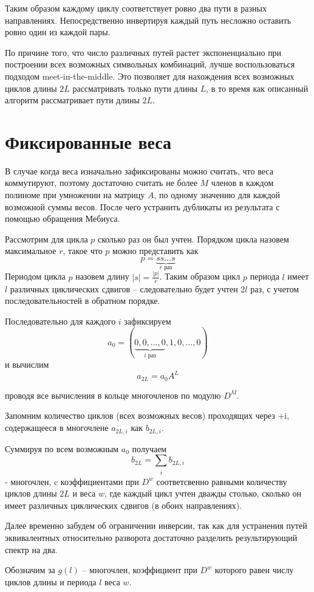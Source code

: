 \documentclass[specification,annotation,times]{itmo-student-thesis}
\begin{document}
Таким образом каждому циклу соответствует ровно два пути в разных направлениях. Непосредственно
инвертируя каждый путь несложно оставить ровно один из каждой пары.

По причине того, что число различных путей растет
экспоненциально при построении всех возможных символьных комбинаций, лучше воспользоваться подходом
meet-in-the-middle. Это позволяет для нахождения всех возможных циклов длины $2L$ рассматривать
только пути длины $L$, в то время как описанный алгоритм рассматривает пути длины $2L$.

\section{Фиксированные веса}
В случае когда веса изначально зафиксированы можно считать, что веса коммутируют, поэтому достаточно
считать не более $M$ членов в каждом полиноме при умножении на матрицу $A$,
 по одному значению для каждой возможной суммы весов. После чего устранить дубликаты из результата с 
помощью обращения Мебиуса.

Рассмотрим для цикла $p$ сколько раз он был учтен. Порядком цикла назовем максимальное $r$, такое что
$p$ можно представить как 
\[
p=\underbrace{ss \ldots s}_{r \text{ раз}}
\]
Периодом цикла $p$ назовем длину $|s|=\frac{|p|}{r}$. Таким образом цикл $p$ 
периода $l$ имеет $l$ различных циклических сдвигов -- следовательно будет учтен $2l$ раз, с учетом
последовательностей в обратном порядке.

Последовательно для каждого $i$ зафиксируем
\[
a_0=(\underbrace{0,0,...,0}_{i \text{ раз}},1,0,...,0)
\]
и вычислим
\[
a_{2L}=a_0A^L
\]

проводя все вычисления в кольце многочленов по модулю $D^M$.

Запомним количество циклов (всех возможных весов) проходящих через +i, содержащееся в 
многочлене $a_{2L,i}$ как $b_{2L,i}$.

Суммируя по всем возможным $a_0$ получаем 
\[
b_{2L}=\sum_{\substack{i}}b_{2L,i}
\]
 - многочлен, c коэффициентами при $D^w$ соответсвенно равными количеству циклов длины $2L$ и веса $w$,
 где каждый цикл учтен дважды столько, сколько он имеет различных циклических
 сдвигов (в обоих направлениях).  

Далее временно забудем об ограничении инверсии, так как для устранения путей эквивалентных
относительно разворота достаточно разделить результирующий спектр на два.

Обозначим за $g(l)$ -- многочлен, коэффициент при $D^w$ которого равен числу циклов длины и периода $l$ веса $w$.
\end{document}
